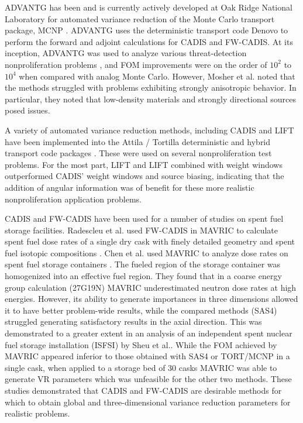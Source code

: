 ADVANTG \cite{mosher_automated_2009}
has been and is currently actively
developed at Oak Ridge National Laboratory \cite{mosher_new_2010,
wagner_review_2011, bevill_new_2012} for automated variance reduction of
the Monte Carlo transport package, MCNP \cite{mcnp_manual_v2}.
ADVANTG uses the deterministic
transport code Denovo \cite{evans_denovo:_2010-1} to perform the forward and
adjoint calculations for CADIS and FW-CADIS. At its inception, ADVANTG was used
to analyze various threat-detection nonproliferation problems
\cite{mosher_automated_2009}, and FOM improvements were on the order of $10^2$
to $10^4$ when compared with analog Monte Carlo. However, Mosher et al. noted
that the methods struggled with problems exhibiting strongly anisotropic
behavior. In particular, they noted that low-density materials and strongly
directional sources posed issues.

A variety of automated variance reduction methods, including CADIS and LIFT have
been implemented into the Attila / Tortilla deterministic and hybrid transport
code packages \cite{somasundaram_implementation_2013}. These were used on several
nonproliferation test problems. For the most part, LIFT and LIFT combined with
weight windows outperformed CADIS' weight windows and source biasing, indicating
that the addition of angular information was of benefit for these more realistic
nonproliferation application
problems.

CADIS and FW-CADIS have been used for a number of studies on spent fuel storage
facilities.
Radescleu et al. used FW-CADIS in MAVRIC to calculate spent fuel
dose rates of a single dry cask
with finely detailed geometry and spent fuel isotopic compositions
\cite{radulescu_dose_2013}.
Chen et al. used MAVRIC \cite{SCALE6_1} to analyze dose rates on spent fuel
storage containers \cite{chen_surface_2011}. The fueled region of the storage
container was homogenized into an effective fuel region.
They found that in a coarse energy
group calculation (27G19N) MAVRIC underestimated neutron dose rates at high
energies. However, its ability to generate importances in three dimensions
allowed it to have better problem-wide results, while the compared methods
(SAS4) struggled generating satisfactory results in the axial direction. This
was demonstrated to a greater extent in an analysis of an independent spent
nuclear fuel storage installation (ISFSI) \cite{sheu_dose_2011} by Sheu et al..
While the FOM
achieved by MAVRIC appeared inferior to those obtained with SAS4 or TORT/MCNP in
a single cask, when applied to a storage bed of 30 casks MAVRIC was able to
generate VR parameters which was unfeasible for the other two methods. These
studies demonstrated that CADIS and FW-CADIS are desirable methods for which to
obtain global and three-dimensional variance reduction parameters for realistic
problems.

